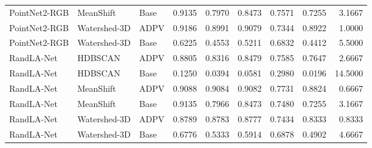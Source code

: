 \begin{table}
\begin{tabular}{lllrrrrrr}
PointNet2-RGB & MeanShift & Base & 0.9135 & 0.7970 & 0.8473 & 0.7571 & 0.7255 & 3.1667 \\
PointNet2-RGB & Watershed-3D & ADPV & 0.9186 & 0.8991 & 0.9079 & 0.7344 & 0.8922 & 1.0000 \\
PointNet2-RGB & Watershed-3D & Base & 0.6225 & 0.4553 & 0.5211 & 0.6832 & 0.4412 & 5.5000 \\
RandLA-Net & HDBSCAN & ADPV & 0.8805 & 0.8316 & 0.8479 & 0.7585 & 0.7647 & 2.6667 \\
RandLA-Net & HDBSCAN & Base & 0.1250 & 0.0394 & 0.0581 & 0.2980 & 0.0196 & 14.5000 \\
RandLA-Net & MeanShift & ADPV & 0.9088 & 0.9084 & 0.9082 & 0.7731 & 0.8824 & 0.6667 \\
RandLA-Net & MeanShift & Base & 0.9135 & 0.7966 & 0.8473 & 0.7480 & 0.7255 & 3.1667 \\
RandLA-Net & Watershed-3D & ADPV & 0.8789 & 0.8783 & 0.8777 & 0.7434 & 0.8333 & 0.8333 \\
RandLA-Net & Watershed-3D & Base & 0.6776 & 0.5333 & 0.5914 & 0.6878 & 0.4902 & 4.6667 \\
\bottomrule
\end{tabular}
\end{table}
